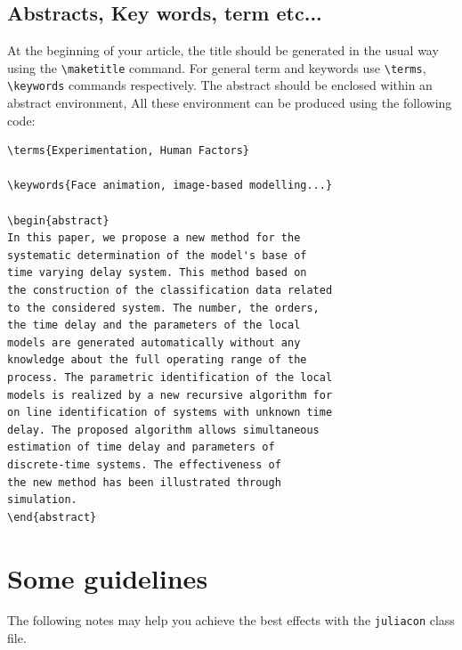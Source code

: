 \documentclass{juliacon}
\begin{document}
\subsection{Abstracts, Key words, term etc...}
\label{subsub:abs_key_etc}

At the beginning of your article, the title should be generated
in the usual way using the \verb|\maketitle|  command. For general term and keywords use
\verb|\terms|,
\verb|\keywords|  commands respectively. The abstract should be enclosed
within an abstract environment, All these environment
can be produced using the following code:
\begin{verbatim}
\terms{Experimentation, Human Factors}

\keywords{Face animation, image-based modelling...}

\begin{abstract}
In this paper, we propose a new method for the
systematic determination of the model's base of
time varying delay system. This method based on
the construction of the classification data related
to the considered system. The number, the orders,
the time delay and the parameters of the local
models are generated automatically without any
knowledge about the full operating range of the
process. The parametric identification of the local
models is realized by a new recursive algorithm for
on line identification of systems with unknown time
delay. The proposed algorithm allows simultaneous
estimation of time delay and parameters of
discrete-time systems. The effectiveness of
the new method has been illustrated through
simulation.
\end{abstract}

\end{verbatim}

\section{Some guidelines}
\label{sec:some_guide}
The following notes may help you achieve the best effects with the
\verb|juliacon|  class file.
\end{document}
